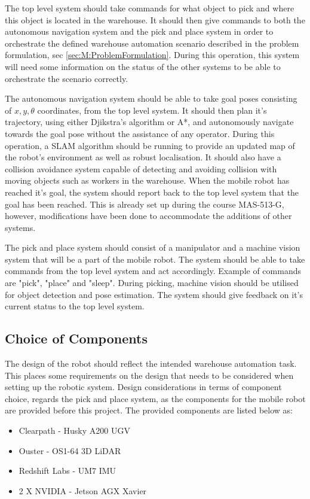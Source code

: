 The top level system should take commands for what object to pick and where this object is located in the warehouse. It should then give commands to both the autonomous navigation system and the pick and place system in order to orchestrate the defined warehouse automation scenario described in the problem formulation, sec \ref{sec:M:ProblemFormulation}. During this operation, this system will need some information on the status of the other systems to be able to orchestrate the scenario correctly.

The autonomous navigation system should be able to take goal poses consisting of $x,y,\theta$ coordinates, from the top level system. It should then plan it's trajectory, using either Djikstra's algorithm or A*, and autonomously navigate towards the goal pose without the assistance of any operator. During this operation, a SLAM algorithm should be running to provide an updated map of the robot's environment as well as robust localisation. It should also have a collision avoidance system capable of detecting and avoiding collision with moving objects such as workers in the warehouse. When the mobile robot has reached it's goal, the system should report back to the top level system that the goal has been reached. This is already set up during the course MAS-513-G, however, modifications have been done to accommodate the additions of other systems.

The pick and place system should consist of a manipulator and a machine vision system that will be a part of the mobile robot. The system should be able to take commands from the top level system and act accordingly. Example of commands are "pick", "place" and "sleep". During picking, machine vision should be utilised for object detection and pose estimation. The system should give feedback on it's current status to the top level system.

\subsection{Choice of Components} \label{sec:M:CD:ChoiceOfComponents}
The design of the robot should reflect the intended warehouse automation task. This places some requirements on the design that needs to be considered when setting up the robotic system. Design considerations in terms of component choice, regards the pick and place system, as the components for the mobile robot are provided before this project. The provided components are listed below as:

\begin{itemize}
    \item Clearpath - Husky A200 UGV
    \item Ouster - OS1-64 3D LiDAR
    \item Redshift Labs - UM7 IMU
    \item 2 X NVIDIA - Jetson AGX Xavier
\end{itemize}

